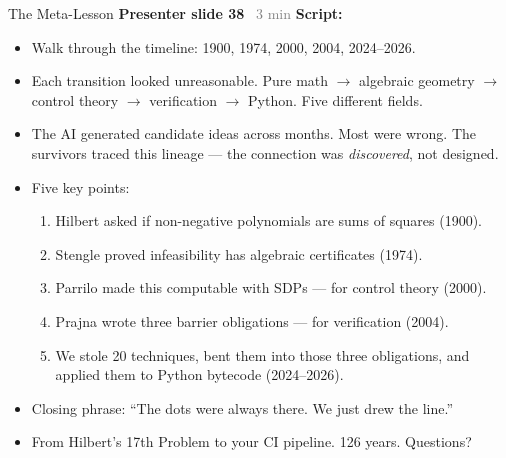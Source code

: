 \documentclass[aspectratio=169]{beamer}
\newcommand{\syncline}[2]{\textbf{#1} \hfill \textcolor{gray}{#2}}
\begin{document}
\begin{frame}{The Meta-Lesson}
\syncline{Presenter slide 38}{~3 min}
\textbf{Script:}
\begin{itemize}
  \item Walk through the timeline: 1900, 1974, 2000, 2004, 2024--2026.
  \item Each transition looked unreasonable. Pure math $\to$ algebraic geometry $\to$ control theory $\to$ verification $\to$ Python. Five different fields.
  \item The AI generated candidate ideas across months. Most were wrong. The survivors traced this lineage --- the connection was \emph{discovered}, not designed.
  \item Five key points:
  \begin{enumerate}
    \item Hilbert asked if non-negative polynomials are sums of squares (1900).
    \item Stengle proved infeasibility has algebraic certificates (1974).
    \item Parrilo made this computable with SDPs --- for control theory (2000).
    \item Prajna wrote three barrier obligations --- for verification (2004).
    \item We stole 20 techniques, bent them into those three obligations, and applied them to Python bytecode (2024--2026).
  \end{enumerate}
  \item Closing phrase: ``The dots were always there. We just drew the line.''
  \item From Hilbert's 17th Problem to your CI pipeline. 126 years. Questions?
\end{itemize}
\end{frame}
\end{document}
